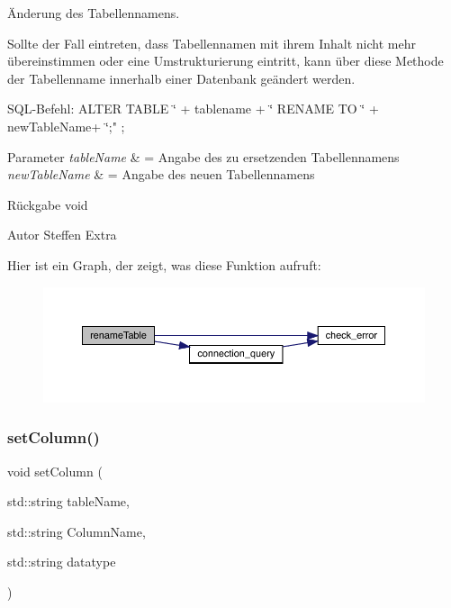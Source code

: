 Änderung des Tabellennamens. 

Sollte der Fall eintreten, dass Tabellennamen mit ihrem Inhalt nicht mehr übereinstimmen oder eine Umstrukturierung eintritt, kann über diese Methode der Tabellenname innerhalb einer Datenbank geändert werden.~\newline


S\+Q\+L-\/\+Befehl\+: A\+L\+T\+ER T\+A\+B\+LE \char`\"{} + tablename + \char`\"{} R\+E\+N\+A\+ME TO \char`\"{} + new\+Table\+Name+ \char`\"{};" ;


\begin{DoxyParams}{Parameter}
{\em table\+Name} & = Angabe des zu ersetzenden Tabellennamens \\
\hline
{\em new\+Table\+Name} & = Angabe des neuen Tabellennamens\\
\hline
\end{DoxyParams}
\begin{DoxyReturn}{Rückgabe}
void
\end{DoxyReturn}
\begin{DoxyAuthor}{Autor}
Steffen Extra 
\end{DoxyAuthor}
Hier ist ein Graph, der zeigt, was diese Funktion aufruft\+:\nopagebreak
\begin{figure}[H]
\begin{center}
\leavevmode
\includegraphics[width=350pt]{tables_8hpp_a526b049a888b2a4a1332a10540689afd_cgraph}
\end{center}
\end{figure}
\mbox{\label{tables_8hpp_a7c4575b6ed6eb203c2796930c41ed555}} 
\subsubsection{set\+Column()}
{\footnotesize\ttfamily void set\+Column (\begin{DoxyParamCaption}\item[{std\+::string}]{table\+Name,  }\item[{std\+::string}]{Column\+Name,  }\item[{std\+::string}]{datatype }\end{DoxyParamCaption})}



